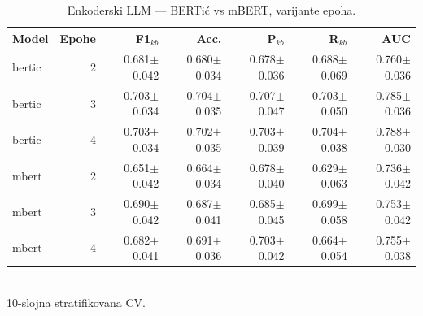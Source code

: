 \begin{table}[H]\centering
\caption{Enkoderski LLM --- BERTić vs mBERT, varijante epoha.}\label{tab:encoder}
\begin{tabular}{lrrrrrr}
\toprule
Model & Epohe & F1$_{kb}$ & Acc. & P$_{kb}$ & R$_{kb}$ & AUC \\
\midrule
bertic & 2 & 0.681$\pm$0.042 & 0.680$\pm$0.034 & 0.678$\pm$0.036 & 0.688$\pm$0.069 & 0.760$\pm$0.036 \\
bertic & 3 & 0.703$\pm$0.034 & 0.704$\pm$0.035 & 0.707$\pm$0.047 & 0.703$\pm$0.050 & 0.785$\pm$0.036 \\
bertic & 4 & 0.703$\pm$0.034 & 0.702$\pm$0.035 & 0.703$\pm$0.039 & 0.704$\pm$0.038 & 0.788$\pm$0.030 \\
mbert & 2 & 0.651$\pm$0.042 & 0.664$\pm$0.034 & 0.678$\pm$0.040 & 0.629$\pm$0.063 & 0.736$\pm$0.042 \\
mbert & 3 & 0.690$\pm$0.042 & 0.687$\pm$0.041 & 0.685$\pm$0.045 & 0.699$\pm$0.058 & 0.753$\pm$0.042 \\
mbert & 4 & 0.682$\pm$0.041 & 0.691$\pm$0.036 & 0.703$\pm$0.042 & 0.664$\pm$0.054 & 0.755$\pm$0.038 \\
\bottomrule
\end{tabular}
\\[2pt]\footnotesize 10-slojna stratifikovana CV.
\end{table}
